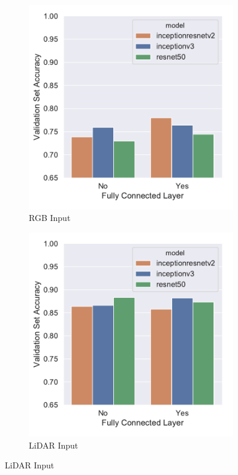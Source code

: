 \begin{figure}[ht]
    \centering
    \begin{subfigure}[t]{0.45\columnwidth}
        \centering
        \includegraphics[width=0.99\textwidth]{chapter_4_roofshape/imgs/val_data_set_cnn_rgb.pdf}
        \caption{RGB Input}
        \label{fig:rgb_val}
    \end{subfigure}%
    \hfill
    \begin{subfigure}[t]{0.45\columnwidth}
        \centering
        \includegraphics[width=0.99\textwidth]{chapter_4_roofshape/imgs/val_data_set_cnn_lidar.pdf}
        \caption{LiDAR Input}
        \label{fig:lidar_val}
    \end{subfigure}
    \vspace{-12PT}


\end{figure}
